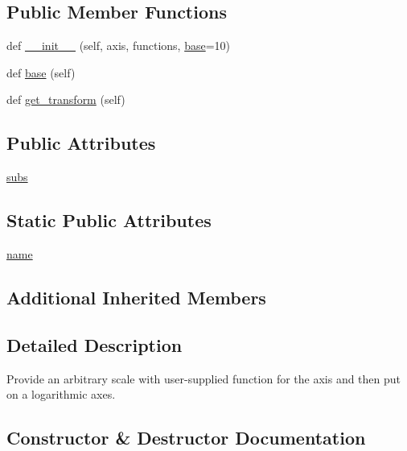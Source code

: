 \subsection*{Public Member Functions}
\begin{DoxyCompactItemize}
\item 
def \hyperlink{classmatplotlib_1_1scale_1_1FuncScaleLog_aa4bb39fe857cedc9b2b8e4506bfa74f1}{\+\_\+\+\_\+init\+\_\+\+\_\+} (self, axis, functions, \hyperlink{classmatplotlib_1_1scale_1_1FuncScaleLog_ae90716909ca7baec2acac6a61128ac23}{base}=10)
\item 
def \hyperlink{classmatplotlib_1_1scale_1_1FuncScaleLog_ae90716909ca7baec2acac6a61128ac23}{base} (self)
\item 
def \hyperlink{classmatplotlib_1_1scale_1_1FuncScaleLog_a21b9d1201a6921f77b9c372fe468af1e}{get\+\_\+transform} (self)
\end{DoxyCompactItemize}
\subsection*{Public Attributes}
\begin{DoxyCompactItemize}
\item 
\hyperlink{classmatplotlib_1_1scale_1_1FuncScaleLog_ab14c6a8092aa679be91ac31cdff2daec}{subs}
\end{DoxyCompactItemize}
\subsection*{Static Public Attributes}
\begin{DoxyCompactItemize}
\item 
\hyperlink{classmatplotlib_1_1scale_1_1FuncScaleLog_a55a251b6545764fe989bd8b3037ebc50}{name}
\end{DoxyCompactItemize}
\subsection*{Additional Inherited Members}


\subsection{Detailed Description}
\begin{DoxyVerb}Provide an arbitrary scale with user-supplied function for the axis and
then put on a logarithmic axes.
\end{DoxyVerb}
 

\subsection{Constructor \& Destructor Documentation}
\mbox{\label{classmatplotlib_1_1scale_1_1FuncScaleLog_aa4bb39fe857cedc9b2b8e4506bfa74f1}} 
